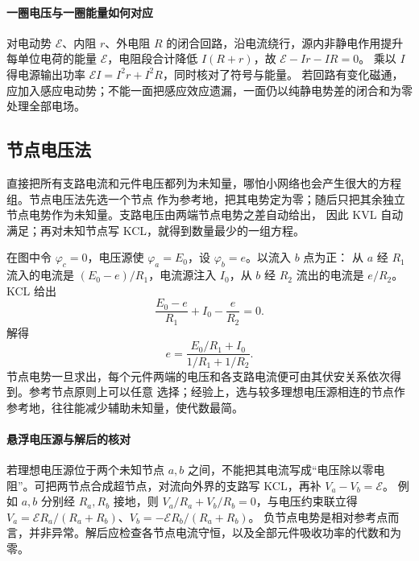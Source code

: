 {%
\paragraph{一圈电压与一圈能量如何对应}
对电动势 $\mathcal E$、内阻 $r$、外电阻 $R$ 的闭合回路，沿电流绕行，源内非静电作用提升每单位电荷的能量 $\mathcal E$，电阻段合计降低 $I(R+r)$，故
$\mathcal E-Ir-IR=0$。
乘以 $I$ 得电源输出功率 $\mathcal EI=I^2r+I^2R$，同时核对了符号与能量。
若回路有变化磁通，应加入感应电动势；不能一面把感应效应遗漏，一面仍以纯静电势差的闭合和为零处理全部电场。


\subsection{节点电压法}


直接把所有支路电流和元件电压都列为未知量，哪怕小网络也会产生很大的方程组。节点电压法先选一个节点
作为参考地，把其电势定为零；随后只把其余独立节点电势作为未知量。支路电压由两端节点电势之差自动给出，
因此 KVL 自动满足；再对未知节点写 KCL，就得到数量最少的一组方程。

\par\noindent\begin{minipage}{\linewidth}
\nodeMethodFigure
{}
\end{minipage}\par\medskip

在图中令 $\varphi_c=0$，电压源使 $\varphi_a=E_0$，设 $\varphi_b=e$。以流入 $b$ 点为正：
从 $a$ 经 $R_1$ 流入的电流是 $(E_0-e)/R_1$，电流源注入 $I_0$，从 $b$ 经 $R_2$ 流出的电流是
$e/R_2$。KCL 给出
\[
  \frac{E_0-e}{R_1}+I_0-\frac e{R_2}=0.
\]
解得
\[
  \boxed{e=\frac{E_0/R_1+I_0}{1/R_1+1/R_2}}.
\]
节点电势一旦求出，每个元件两端的电压和各支路电流便可由其伏安关系依次得到。参考节点原则上可以任意
选择；经验上，选与较多理想电压源相连的节点作参考地，往往能减少辅助未知量，使代数最简。

\paragraph{悬浮电压源与解后的核对}
若理想电压源位于两个未知节点 $a,b$ 之间，不能把其电流写成“电压除以零电阻”。可把两节点合成超节点，对流向外界的支路写 KCL，再补 $V_a-V_b=\mathcal E$。
例如 $a,b$ 分别经 $R_a,R_b$ 接地，则
$V_a/R_a+V_b/R_b=0$，与电压约束联立得
$V_a=\mathcal E R_a/(R_a+R_b)$、$V_b=-\mathcal E R_b/(R_a+R_b)$。
负节点电势是相对参考点而言，并非异常。解后应检查各节点电流守恒，以及全部元件吸收功率的代数和为零。




}
